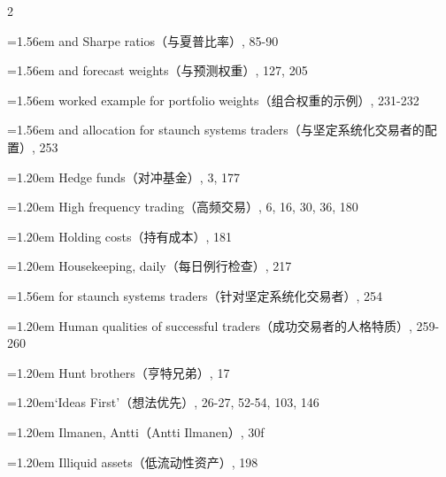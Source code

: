{\begin{multicols}{2}
\par \noindent\hangindent=1.56em\hspace*{0.36em} and Sharpe ratios（与夏普比率）, 85-90
\par \noindent\hangindent=1.56em\hspace*{0.36em} and forecast weights（与预测权重）, 127, 205
\par \noindent\hangindent=1.56em\hspace*{0.36em} worked example for portfolio weights（组合权重的示例）, 231-232
\par \noindent\hangindent=1.56em\hspace*{0.36em} and allocation for staunch systems traders（与坚定系统化交易者的配置）, 253
\par \noindent\hangindent=1.20em\hspace*{0.00em} Hedge funds（对冲基金）, 3, 177
\par \noindent\hangindent=1.20em\hspace*{0.00em} High frequency trading（高频交易）, 6, 16, 30, 36, 180
\par \noindent\hangindent=1.20em\hspace*{0.00em} Holding costs（持有成本）, 181
\par \noindent\hangindent=1.20em\hspace*{0.00em} Housekeeping, daily（每日例行检查）, 217
\par \noindent\hangindent=1.56em\hspace*{0.36em} for staunch systems traders（针对坚定系统化交易者）, 254
\par \noindent\hangindent=1.20em\hspace*{0.00em} Human qualities of successful traders（成功交易者的人格特质）, 259-260
\par \noindent\hangindent=1.20em\hspace*{0.00em} Hunt brothers（亨特兄弟）, 17
\par \noindent\hangindent=1.20em\hspace*{0.00em}‘Ideas First’（想法优先）, 26-27, 52-54, 103, 146
\par \noindent\hangindent=1.20em\hspace*{0.00em} Ilmanen, Antti（Antti Ilmanen）, 30f
\par \noindent\hangindent=1.20em\hspace*{0.00em} Illiquid assets（低流动性资产）, 198

\end{multicols}}
